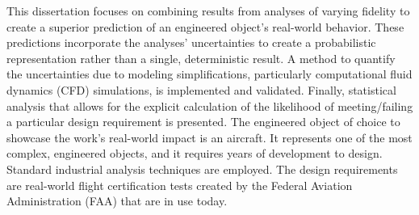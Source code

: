 This dissertation focuses on combining results from analyses of varying fidelity to create a superior prediction of an engineered object's real-world behavior.
These predictions incorporate the analyses' uncertainties to create a probabilistic representation rather than a single, deterministic result.
A method to quantify the uncertainties due to modeling simplifications, particularly computational fluid dynamics (CFD) simulations, is implemented and validated.
Finally, statistical analysis that allows for the explicit calculation of the likelihood of meeting/failing a particular design requirement is presented.
The engineered object of choice to showcase the work's real-world impact is an aircraft.
It represents one of the most complex, engineered objects, and it requires years of development to design.
Standard industrial analysis techniques are employed.
The design requirements are real-world flight certification tests created by the Federal Aviation Administration (FAA) that are in use today.